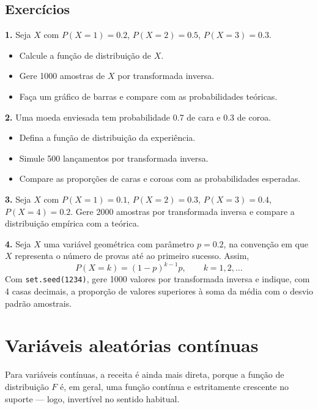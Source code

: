 \documentclass[
  portuguese,
  11pt,
  openany]{book}
\providecommand{\tightlist}{%
  \setlength{\itemsep}{0pt}\setlength{\parskip}{0pt}}
\begin{document}
\subsection{Exercícios}\label{exercuxedcios-33}

\textbf{1.} Seja \(X\) com \(P(X = 1) = 0.2\), \(P(X = 2) = 0.5\), \(P(X = 3) = 0.3\).

\begin{itemize}
\tightlist
\item
  Calcule a função de distribuição de \(X\).
\item
  Gere 1000 amostras de \(X\) por transformada inversa.
\item
  Faça um gráfico de barras e compare com as probabilidades teóricas.
\end{itemize}

\textbf{2.} Uma moeda enviesada tem probabilidade 0.7 de cara e 0.3 de coroa.

\begin{itemize}
\tightlist
\item
  Defina a função de distribuição da experiência.
\item
  Simule 500 lançamentos por transformada inversa.
\item
  Compare as proporções de caras e coroas com as probabilidades esperadas.
\end{itemize}

\textbf{3.} Seja \(X\) com \(P(X = 1) = 0.1\), \(P(X = 2) = 0.3\), \(P(X = 3) = 0.4\),
\(P(X = 4) = 0.2\). Gere 2000 amostras por transformada inversa e compare a distribuição
empírica com a teórica.

\textbf{4.} Seja \(X\) uma variável geométrica com parâmetro \(p = 0.2\), na convenção em que
\(X\) representa o número de provas até ao primeiro sucesso. Assim,
\[
P(X=k)=(1-p)^{k-1}p, \qquad k=1,2,\ldots
\]
Com \texttt{set.seed(1234)}, gere 1000 valores por transformada inversa e indique, com 4 casas
decimais, a proporção de valores superiores à soma da média com o desvio padrão
amostrais.

\section{Variáveis aleatórias contínuas}\label{variuxe1veis-aleatuxf3rias-contuxednuas}

Para variáveis contínuas, a receita é ainda mais direta, porque a função de distribuição
\(F\) é, em geral, uma função contínua e estritamente crescente no suporte --- logo,
invertível no sentido habitual.
\end{document}
